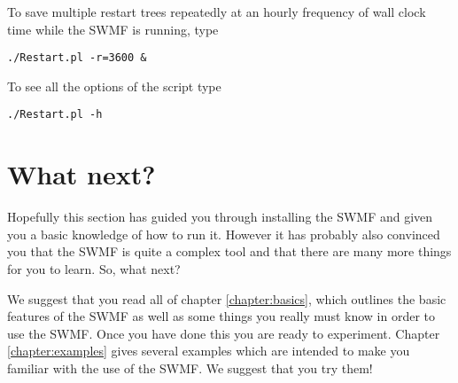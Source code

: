 To save multiple restart trees repeatedly at an hourly frequency of 
wall clock time while the SWMF is running, type
\begin{verbatim}
./Restart.pl -r=3600 &
\end{verbatim}
To see all the options of the script type
\begin{verbatim}
./Restart.pl -h
\end{verbatim}

\section{What next?}

Hopefully this section has guided you through installing the SWMF and
given you a basic knowledge of how to run it.  However it has probably
also convinced you that the SWMF is quite a complex tool and that there
are many more things for you to learn.  So, what next?

We suggest that you read all of chapter \ref{chapter:basics}, which
outlines the basic features of the SWMF as well as some things you
really must know in order to use the SWMF.  Once you have done this you
are ready to experiment.  Chapter \ref{chapter:examples} gives several 
examples which are intended to make you familiar with the use of the
SWMF.  We suggest that you try them!

%
